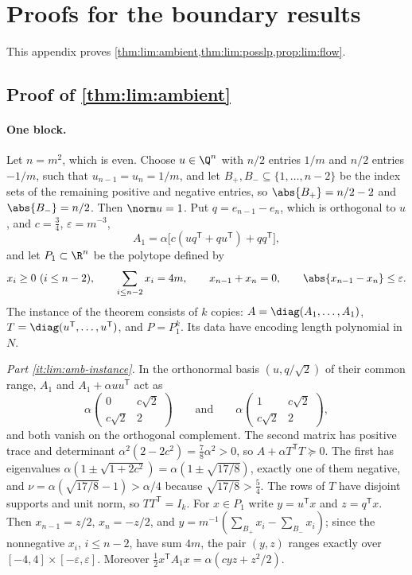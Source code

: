\section{Proofs for the boundary results}\label{app:lim}

This appendix proves \cref{thm:lim:ambient,thm:lim:posslp,prop:lim:flow}.

\subsection{Proof of \texorpdfstring{\cref{thm:lim:ambient}}{the ambient-count theorem}}\label{app:lim:ambient}

\paragraph{One block.}
Let $n=m^2$, which is even. Choose $u\in\Q^n$ with $n/2$ entries $1/m$ and
$n/2$ entries $-1/m$, such that $u_{n-1}=u_n=1/m$, and let
$B_+,B_-\subseteq\{1,\ldots,n-2\}$ be the index sets of the remaining positive
and negative entries, so $\abs{B_+}=n/2-2$ and $\abs{B_-}=n/2$. Then
$\norm u=1$. Put $q=e_{n-1}-e_n$, which is orthogonal to $u$, and
$c=\frac34$, $\varepsilon=m^{-3}$,
\[
 A_1=\alpha\bigl[c(uq^{\mathsf T}+qu^{\mathsf T})+qq^{\mathsf T}\bigr],
\]
and let $P_1\subset\R^n$ be the polytope defined by
\[
 x_i\ge0\ (i\le n-2),\qquad\sum_{i\le n-2}x_i=4m,\qquad
 x_{n-1}+x_n=0,\qquad\abs{x_{n-1}-x_n}\le\varepsilon .
\]
The instance of the theorem consists of $k$ copies:
$A=\diag(A_1,\ldots,A_1)$, $T=\diag(u^{\mathsf T},\ldots,u^{\mathsf T})$, and
$P=P_1^k$. Its data have encoding length polynomial in $N$.

\emph{Part \ref{it:lim:amb-instance}.} In the orthonormal basis
$(u,q/\sqrt2)$ of their common range, $A_1$ and $A_1+\alpha uu^{\mathsf T}$
act as
\[
 \alpha\begin{pmatrix}0&c\sqrt2\\c\sqrt2&2\end{pmatrix}
 \qquad\text{and}\qquad
 \alpha\begin{pmatrix}1&c\sqrt2\\c\sqrt2&2\end{pmatrix},
\]
and both vanish on the orthogonal complement. The second matrix has positive
trace and determinant $\alpha^2(2-2c^2)=\frac78\alpha^2>0$, so
$A+\alpha T^{\mathsf T}T\succeq0$. The first has eigenvalues
$\alpha(1\pm\sqrt{1+2c^2})=\alpha(1\pm\sqrt{17/8})$, exactly one of them
negative, and $\nu=\alpha(\sqrt{17/8}-1)>\alpha/4$ because
$\sqrt{17/8}>\frac54$. The rows of $T$ have disjoint supports and unit norm,
so $TT^{\mathsf T}=I_k$. For $x\in P_1$ write $y=u^{\mathsf T}x$ and
$z=q^{\mathsf T}x$. Then $x_{n-1}=z/2$, $x_n=-z/2$, and
$y=m^{-1}(\sum_{B_+}x_i-\sum_{B_-}x_i)$; since the nonnegative $x_i$,
$i\le n-2$, have sum $4m$, the pair $(y,z)$ ranges exactly over
$[-4,4]\times[-\varepsilon,\varepsilon]$. Moreover
$\frac12x^{\mathsf T}A_1x=\alpha(cyz+z^2/2)$.

